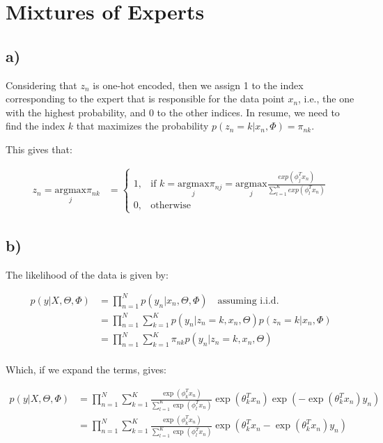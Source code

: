 \documentclass[12pt,a4paper,oneside]{paper}
\begin{document}
\section{Mixtures of Experts}

\subsection*{a)}

Considering that $z_n$ is one-hot encoded, then we assign 1 to the index corresponding to the expert that is responsible
for the data point $x_n$, i.e., the one with the highest probability, and 0 to the other indices.
In resume, we need to find the index $k$ that maximizes the probability $p(z_n = k | x_n, \Phi) = \pi_{nk}$.

This gives that:

\begin{align*}
    z_n = \underset{j}{\mathrm{argmax}} \pi_{nk}
    &= \begin{cases}
        1, & \text{if } k = \underset{j}{\mathrm{argmax}} \pi_{nj} = \underset{j}{\mathrm{argmax}} \frac{exp(\phi_j^T x_n)}{\sum_{l=1}^{K} exp(\phi_l^T x_n)} \\
        0, & \text{otherwise}
    \end{cases}
\end{align*}

\subsection*{b)}

The likelihood of the data is given by:

\begin{align*}
    p(y | X, \Theta, \Phi) &= \prod_{n=1}^{N} p(y_n | x_n, \Theta, \Phi) \quad \text{assuming i.i.d.} \\
    &= \prod_{n=1}^{N} \sum_{k=1}^{K} p(y_n | z_n = k, x_n, \Theta) p(z_n = k | x_n, \Phi) \\
    &= \prod_{n=1}^{N} \sum_{k=1}^{K} \pi_{nk} p(y_n | z_n = k, x_n, \Theta) \\
\end{align*}

Which, if we expand the terms, gives:

\begin{align*}
    p(y | X, \Theta, \Phi) &= \prod_{n=1}^{N} \sum_{k=1}^{K} \frac{\exp(\phi_k^T x_n)}{\sum_{l=1}^{K} \exp(\phi_l^T x_n)} \exp(\theta_k^T x_n) \exp(-\exp(\theta_k^T x_n) y_n) \\
    &= \prod_{n=1}^{N} \sum_{k=1}^{K} \frac{\exp(\phi_k^T x_n)}{\sum_{l=1}^{K} \exp(\phi_l^T x_n)} \exp(\theta_k^T x_n -\exp(\theta_k^T x_n) y_n) \\
\end{align*}
\end{document}
